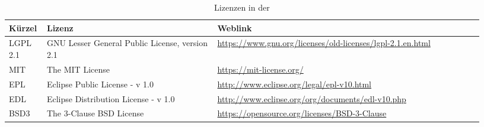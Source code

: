 \begin{landscape}
\begin{table}[htb]
	\caption{Lizenzen in der \skfw}
	\begin{tabular}{|p{0.06\linewidth}|p{0.34\linewidth}|p{0.53\linewidth}|}
		\hline
		Kürzel & Lizenz & Weblink \\ \hline
		LGPL 2.1 & GNU Lesser General Public License, version 2.1 & \url{https://www.gnu.org/licenses/old-licenses/lgpl-2.1.en.html} \\ \hline
		MIT & The MIT License & \url{https://mit-license.org/} \\ \hline
		EPL & Eclipse Public License - v 1.0 & \url{http://www.eclipse.org/legal/epl-v10.html} \\ \hline
		EDL & Eclipse Distribution License - v 1.0 & \url{http://www.eclipse.org/org/documents/edl-v10.php} \\ \hline
		BSD3 & The 3-Clause BSD License & \url{https://opensource.org/licenses/BSD-3-Clause} \\ \hline
	\end{tabular}
	\label{tbl:sklicenses}
\end{table}


\end{landscape}
